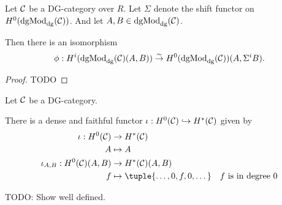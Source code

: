 
\begin{proposition}
    \label{prop:H^i_dgmod_cong_H^0_with_shift}
    Let \( {\mathcal{C}} \) be a DG-category over \( R \). Let \( \Sigma \) denote the shift functor on \( H^0(\operatorname{dgMod}_{\operatorname{dg}}({\mathcal{C}})) \). And let \( A, B \in \operatorname{dgMod}_{\operatorname{dg}}({\mathcal{C}}) \).

    Then there is an isomorphism
    \[
        \phi: H^i(\operatorname{dgMod}_{\operatorname{dg}}({\mathcal{C}})(A, B)) \stackrel{\sim}{\to} H^0(\operatorname{dgMod}_{\operatorname{dg}}({\mathcal{C}}))(A, \Sigma^i B).
    \]
\end{proposition}
\begin{proof}
    TODO
\end{proof}

\begin{remark}
    \label{rem:H^0_into_H^*_inclusion}
    Let \( {\mathcal{C}} \) be a DG-category.

    There is a dense and faithful functor \( \iota: H^0({\mathcal{C}}) \hookrightarrow H^*({\mathcal{C}}) \) given by
    \begin{align*}
        \iota: H^0(\Cc) &\to H^*(\Cc) \\
        A &\mapsto A \\
        \iota_{A, B}: H^0(\Cc)(A, B) &\to H^*(\Cc)(A, B) \\
        f &\mapsto \tuple{\dots, 0, f, 0, \dots} \quad \text{\( f \) is in degree \( 0 \)}
    \end{align*}

    TODO: Show well defined.
\end{remark}

